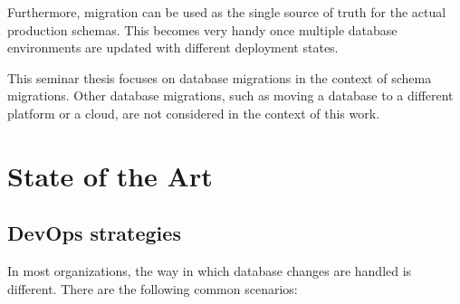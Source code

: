 Furthermore, migration can be used as the single source of truth for the actual production schemas. This becomes very handy once multiple database environments are updated with different deployment states.

%
This seminar thesis focuses on database migrations in the context of schema migrations.  Other database migrations, such as moving a database to a different platform or a cloud, are not considered in the context of this work.

\newpage
\section{State of the Art}%
\subsection{DevOps strategies}
%
In most organizations, the way in which database changes are handled is different. There are the following common scenarios:

